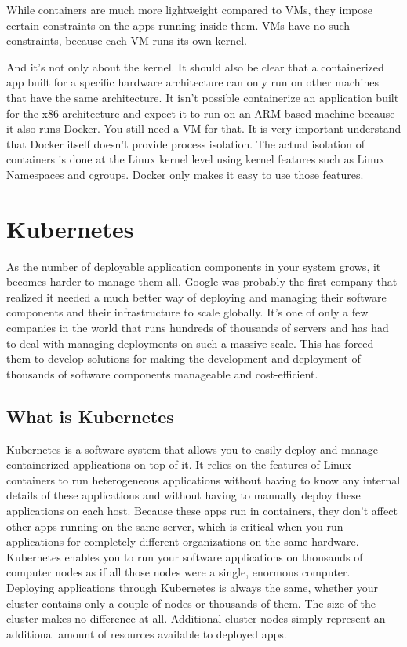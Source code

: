 While containers are much more lightweight compared to VMs, they impose certain constraints on the apps running inside them. VMs have no such constraints, because each VM runs its own kernel.

And it’s not only about the kernel. It should also be clear that a containerized app built for a specific hardware architecture can only run on other machines that have the same architecture. It isn't possible containerize an application built for the x86 architecture and expect it to run on an ARM-based machine because it also runs Docker. You still need a VM for that.
It is very important understand that Docker itself doesn’t provide process isolation. The actual isolation of containers is done at the Linux kernel level using kernel features such as Linux Namespaces and cgroups. Docker only makes it easy to use those features.


\section{Kubernetes} \label{sec:kubernetesbackground}
As the number of deployable application components in your system grows, it becomes harder to manage them all. Google was probably the first company that realized it needed a much better way of deploying and managing their software components and their infrastructure to scale globally. It’s one of only a few companies in the world that runs hundreds of thousands of servers and has had to deal with managing deployments on such a massive scale. This has forced them to develop solutions for making the development and deployment of thousands of software components manageable and cost-efficient.


\subsection{What is Kubernetes}
Kubernetes is a software system that allows you to easily deploy and manage containerized applications on top of it. It relies on the features of Linux containers to run heterogeneous applications without having to know any internal details of these applications and without having to manually deploy these applications on each host. Because these apps run in containers, they don’t affect other apps running on the same server, which is critical when you run applications for completely different organizations on the same hardware.
Kubernetes enables you to run your software applications on thousands of computer nodes as if all those nodes were a single, enormous computer.
Deploying applications through Kubernetes is always the same, whether your cluster contains only a couple of nodes or thousands of them. The size of the cluster makes no difference at all. Additional cluster nodes simply represent an additional amount of resources available to deployed apps.

